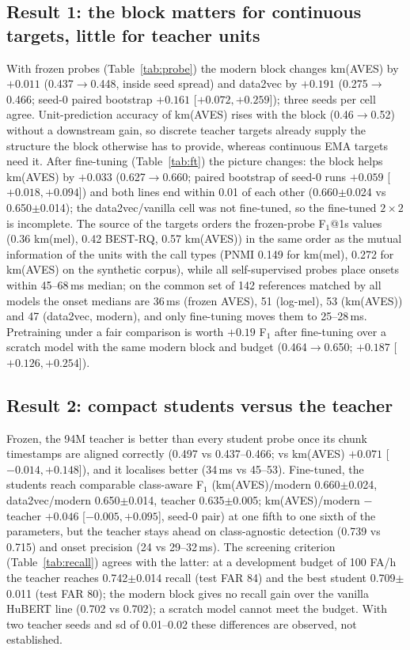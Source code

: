 \documentclass[10pt,twocolumn]{article}
\newcommand{\Fone}{F$_1$}
\begin{document}
\subsection{Result 1: the block matters for continuous targets, little for teacher units}
\label{sec:r1}
With frozen probes (Table~\ref{tab:probe}) the modern block changes km(AVES) by $+0.011$ (0.437$\to$0.448, inside seed spread) and data2vec by $+0.191$ (0.275$\to$0.466; seed-0 paired bootstrap $+0.161$ [$+0.072,+0.259$]); three seeds per cell agree. Unit-prediction accuracy of km(AVES) rises with the block (0.46$\to$0.52) without a downstream gain, so discrete teacher targets already supply the structure the block otherwise has to provide, whereas continuous EMA targets need it. After fine-tuning (Table~\ref{tab:ft}) the picture changes: the block helps km(AVES) by $+0.033$ (0.627$\to$0.660; paired bootstrap of seed-0 runs $+0.059$ [$+0.018,+0.094$]) and both lines end within 0.01 of each other (0.660$\pm$0.024 vs 0.650$\pm$0.014); the data2vec/vanilla cell was not fine-tuned, so the fine-tuned $2\times2$ is incomplete. The source of the targets orders the frozen-probe \Fone{}@1s values (0.36 km(mel), 0.42 BEST-RQ, 0.57 km(AVES)) in the same order as the mutual information of the units with the call types (PNMI 0.149 for km(mel), 0.272 for km(AVES) on the synthetic corpus), while all self-supervised probes place onsets within 45--68\,ms median; on the common set of 142 references matched by all models the onset medians are 36\,ms (frozen AVES), 51 (log-mel), 53 (km(AVES)) and 47 (data2vec, modern), and only fine-tuning moves them to 25--28\,ms. Pretraining under a fair comparison is worth $+0.19$ \Fone{} after fine-tuning over a scratch model with the same modern block and budget (0.464$\to$0.650; $+0.187$ [$+0.126,+0.254$]).

\subsection{Result 2: compact students versus the teacher}
\label{sec:r2}
Frozen, the 94M teacher is better than every student probe once its chunk timestamps are aligned correctly (0.497 vs 0.437--0.466; vs km(AVES) $+0.071$ [$-0.014,+0.148$]), and it localises better (34\,ms vs 45--53). Fine-tuned, the students reach comparable class-aware \Fone{} (km(AVES)/modern 0.660$\pm$0.024, data2vec/modern 0.650$\pm$0.014, teacher 0.635$\pm$0.005; km(AVES)/modern $-$ teacher $+0.046$ [$-0.005,+0.095$], seed-0 pair) at one fifth to one sixth of the parameters, but the teacher stays ahead on class-agnostic detection (0.739 vs 0.715) and onset precision (24 vs 29--32\,ms). The screening criterion (Table~\ref{tab:recall}) agrees with the latter: at a development budget of 100 FA/h the teacher reaches 0.742$\pm$0.014 recall (test FAR 84) and the best student 0.709$\pm$0.011 (test FAR 80); the modern block gives no recall gain over the vanilla HuBERT line (0.702 vs 0.702); a scratch model cannot meet the budget. With two teacher seeds and sd of 0.01--0.02 these differences are observed, not established.
\end{document}
